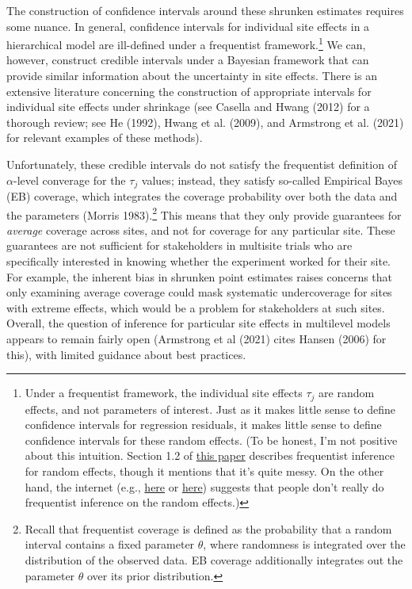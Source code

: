 \documentclass[]{article}
\begin{document}
The construction of confidence intervals around these shrunken estimates requires some nuance.
In general, confidence intervals for individual site effects in a hierarchical model are ill-defined under a frequentist framework.\footnote{Under a frequentist framework, the individual site effects $\tau_j$ are random effects, and not parameters of interest.
Just as it makes little sense to define confidence intervals for regression residuals, it makes little sense to define confidence intervals for these random effects.
(To be honest, I'm not positive about this intuition.
Section 1.2 of  \href{https://core.ac.uk/download/pdf/38903061.pdf}{this paper} describes frequentist inference for random effects, though it mentions that it's quite messy.
On the other hand, the internet (e.g., \href{https://stat.ethz.ch/pipermail/r-sig-mixed-models/2011q3/014077.html}{here} or \href{https://github.com/lme4/lme4/issues/497}{here}) suggests that people don't really do frequentist inference on the random effects.) }
We can, however, construct credible intervals under a Bayesian framework that can provide similar information about the uncertainty in site effects.
There is an extensive literature concerning the construction of appropriate intervals for individual site effects under shrinkage (see Casella and Hwang (2012) for a thorough review; see He (1992), Hwang et al. (2009), and Armstrong et al. (2021) for relevant examples of these methods).

Unfortunately, these credible intervals do not satisfy the frequentist definition of $\alpha$-level converage for the $\tau_j$ values; instead, they satisfy so-called Empirical Bayes (EB) coverage, which integrates the coverage probability over both the data and the parameters (Morris 1983).\footnote{Recall that frequentist coverage is defined as the probability that a random interval contains a fixed parameter $\theta$, where randomness is integrated over the distribution of the observed data.
	EB coverage additionally integrates out the parameter $\theta$ over its prior distribution.}
This means that they only provide guarantees for \textit{average} coverage across sites, and not for coverage for any particular site.
These guarantees are not sufficient for stakeholders in multisite trials who are specifically interested in knowing whether the experiment worked for their site.
For example, the inherent bias in shrunken point estimates raises concerns that only examining average coverage could mask systematic undercoverage for sites with extreme effects, which would be a problem for stakeholders at such sites.
Overall, the question of inference for particular site effects in multilevel models appears to remain fairly open (Armstrong et al (2021) cites Hansen (2006) for this), with limited guidance about best practices.
\end{document}
